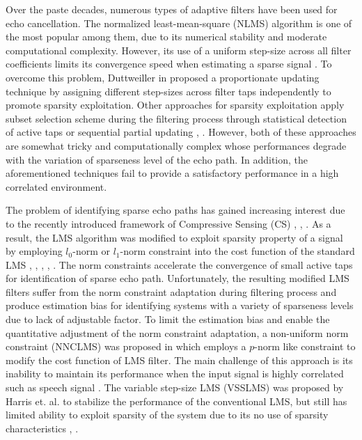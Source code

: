 \vspace{-0.5cm}
\par
\noindent Over the paste decades, numerous types of adaptive filters have been used for echo cancellation. The normalized least-mean-square (NLMS) algorithm is one of the most popular among them, due to its numerical stability and moderate computational complexity. However, its use of a uniform step-size across all filter coefficients limits its convergence speed when estimating a sparse signal \cite{Li}. To overcome this problem, Duttweiller in \cite{Duttweiler} proposed a proportionate updating technique by assigning different step-sizes across filter taps independently to promote sparsity exploitation. Other approaches for sparsity exploitation apply subset selection scheme during the filtering process through statistical detection of active taps or sequential partial updating \cite{Xiang}, \cite{Kawamuri}. However, both of these approaches are somewhat tricky and computationally complex whose performances degrade  with the variation of sparseness level of the echo path. In addition, the aforementioned techniques fail to provide a satisfactory  performance in a high correlated environment.

\vspace{-0.5cm}
\par
\noindent The problem of identifying sparse echo paths has gained increasing interest due to the recently introduced framework of Compressive Sensing (CS) \cite{Dohono}, \cite{Candes2}, \cite{Rey}. As a result, the LMS algorithm was modified to exploit sparsity property of a signal by employing $l_0$-norm or $l_1$-norm  constraint into the cost function of the standard LMS \cite{Gu1}, \cite{Etter1}, \cite{Gu2}, \cite{Jin}, \cite{Shi}. The norm constraints accelerate the convergence of small active taps for identification of sparse echo path. Unfortunately, the resulting modified LMS filters suffer from the norm constraint adaptation during filtering process and produce estimation bias for identifying systems with a variety of sparseness levels due to lack of adjustable factor. To limit the estimation bias and enable the quantitative adjustment of the norm constraint adaptation, a non-uniform norm constraint (NNCLMS) was proposed in \cite{Tong} which employs a $p$-norm like constraint to modify the cost function of LMS filter. The main challenge of this approach is its inability to maintain its performance when the input signal is highly correlated such as speech signal \cite{Johnson}. The variable step-size LMS (VSSLMS) was proposed by Harris et. al.  \cite{Harris} to stabilize the performance of the conventional LMS, but still has limited ability to exploit sparsity of the system due to its no use of sparsity characteristics \cite{Kwong}, \cite{Evans}.

